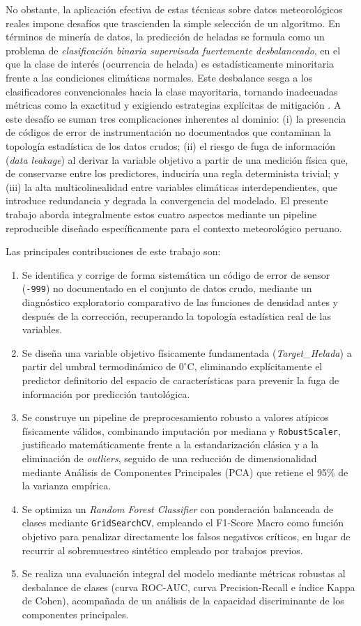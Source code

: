 No obstante, la aplicación efectiva de estas técnicas sobre datos meteorológicos
reales impone desafíos que trascienden la simple selección de un algoritmo. En
términos de minería de datos, la predicción de heladas se formula como un
problema de \emph{clasificación binaria supervisada fuertemente desbalanceado},
en el que la clase de interés (ocurrencia de helada) es estadísticamente
minoritaria frente a las condiciones climáticas normales. Este desbalance sesga
a los clasificadores convencionales hacia la clase mayoritaria, tornando
inadecuadas métricas como la exactitud y exigiendo estrategias explícitas de
mitigación \cite{azhar2023,wang2021}. A este desafío se suman tres
complicaciones inherentes al dominio: (i) la presencia de códigos de error de
instrumentación no documentados que contaminan la topología estadística de los
datos crudos; (ii) el riesgo de fuga de información (\emph{data leakage}) al
derivar la variable objetivo a partir de una medición física que, de conservarse
entre los predictores, induciría una regla determinista trivial; y (iii) la alta
multicolinealidad entre variables climáticas interdependientes, que introduce
redundancia y degrada la convergencia del modelado. El presente trabajo aborda
integralmente estos cuatro aspectos mediante un pipeline reproducible diseñado
específicamente para el contexto meteorológico peruano.

Las principales contribuciones de este trabajo son:
\begin{enumerate}
\item Se identifica y corrige de forma sistemática un código de error de sensor
(\texttt{-999}) no documentado en el conjunto de datos crudo, mediante un
diagnóstico exploratorio comparativo de las funciones de densidad antes y después
de la corrección, recuperando la topología estadística real de las variables.
\item Se diseña una variable objetivo físicamente fundamentada
(\emph{Target\_Helada}) a partir del umbral termodinámico de $0^{\circ}\text{C}$,
eliminando explícitamente el predictor definitorio del espacio de características
para prevenir la fuga de información por predicción tautológica.
\item Se construye un pipeline de preprocesamiento robusto a valores atípicos
físicamente válidos, combinando imputación por mediana y \texttt{RobustScaler},
justificado matemáticamente frente a la estandarización clásica y a la
eliminación de \emph{outliers}, seguido de una reducción de dimensionalidad
mediante Análisis de Componentes Principales (PCA) que retiene el 95\% de la
varianza empírica.
\item Se optimiza un \emph{Random Forest Classifier} con ponderación balanceada
de clases mediante \texttt{GridSearchCV}, empleando el F1-Score Macro como función
objetivo para penalizar directamente los falsos negativos críticos, en lugar de
recurrir al sobremuestreo sintético empleado por trabajos previos.
\item Se realiza una evaluación integral del modelo mediante métricas robustas al
desbalance de clases (curva ROC-AUC, curva Precision-Recall e índice Kappa de
Cohen), acompañada de un análisis de la capacidad discriminante de los
componentes principales.
\end{enumerate}

